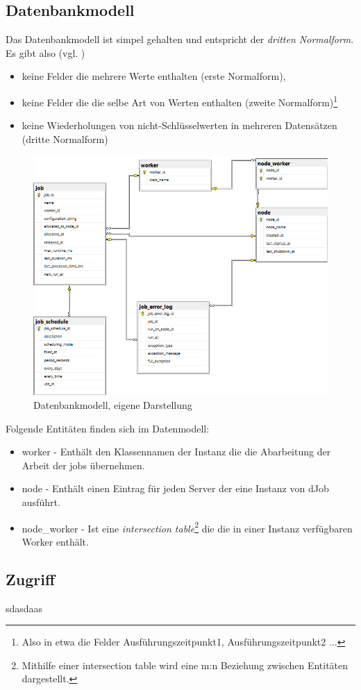 \subsection{Datenbankmodell}
Das Datenbankmodell ist simpel gehalten und entspricht der \emph{dritten Normalform}. Es gibt also (vgl. \parencite[S. 317ff]{dbgrund})\begin{itemize}
	\item keine Felder die mehrere Werte enthalten (erste Normalform),
	\item keine Felder die die selbe Art von Werten enthalten (zweite Normalform)\footnote{Also in etwa die Felder Ausführungszeitpunkt1, Ausführungszeitpunkt2 ...}
	\item keine Wiederholungen von nicht-Schlüsselwerten in mehreren Datensätzen (dritte Normalform)
\end{itemize}
\begin{figure}
	\centering
	\includegraphics[width=0.7\linewidth]{images/dbmodel.png}
	\caption{Datenbankmodell, eigene Darstellung}
	\label{fig:dbmodel}
\end{figure}
Folgende Entitäten finden sich im Datenmodell:
\begin{itemize}
	\item worker - Enthält den Klassennamen der Instanz die die Abarbeitung der Arbeit der jobs übernehmen.
	\item node - Enthält einen Eintrag für jeden Server der eine Instanz von dJob ausführt.
	\item node\_worker - Ist eine \emph{intersection table}\footnote{Mithilfe einer intersection table wird eine m:n Beziehung zwischen Entitäten dargestellt.\parencite{oracle_intersection}} die die in einer Instanz verfügbaren Worker enthält.
\end{itemize}
\subsection{Zugriff}
sdasdaas
